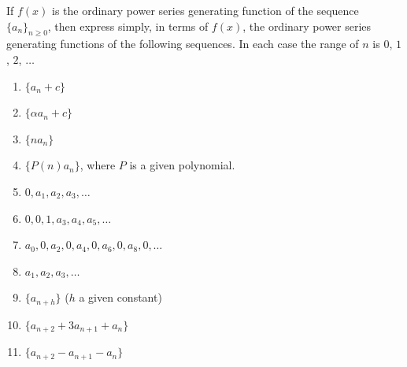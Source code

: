 \begin{exercise}
    \label{ex:1-3}
    If $f(x)$ is the ordinary power series generating function of the sequence $\{a_n\}_{n\geq 0}$, then express simply, in terms of $f(x)$, the ordinary power series generating functions of the following sequences. In each case the range of $n$ is $0$, $1$, $2$, $\ldots$
    \begin{enumerate}[label=(\alph*)]
        \item $\{a_n + c\}$
        \item $\{\alpha a_n + c\}$
        \item $\{na_n\}$
        \item $\{P(n)a_n\}$, where $P$ is a given polynomial.
        \item $0, a_1, a_2, a_3, \ldots$
        \item $0, 0, 1, a_3, a_4, a_5, \ldots$
        \item $a_0, 0, a_2, 0, a_4, 0, a_6, 0, a_8, 0, \ldots$
        \item $a_1, a_2, a_3, \ldots$
        \item $\{a_{n+h}\}$ \quad ($h$ a given constant)
        \item $\{a_{n+2}+3a_{n+1}+a_n\}$
        \item $\{a_{n+2} - a_{n+1} - a_{n}\}$
    \end{enumerate}
\end{exercise}
